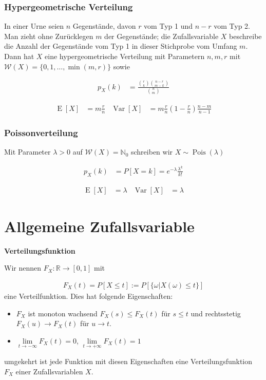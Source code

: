 \documentclass[25pt]{sciposter}
\newcommand{\R}{\mathbb{R}}
\newcommand{\N}{\mathbb{N}}
\newcommand{\W}{\mathcal{W}}
\newcommand{\Var}{\operatorname{Var}}
\newcommand{\E}{\operatorname{E}}
\newenvironment{method}[1]{\begin{mdframed}[backgroundcolor=blue!10,innertopmargin=15pt, innerbottommargin=15pt,nobreak=true]
		\textbf{#1 }
	}
	{ 
	\end{mdframed}
}
\begin{document}
\begin{multicols}{3}
\subsubsection*{Hypergeometrische Verteilung}
In einer Urne seien $n$ Gegenstände, davon $r$ vom Typ 1 und $n-r$ vom Typ 2. Man
zieht ohne Zurücklegen $m$ der Gegenstände; die Zufallsvariable $X$ beschreibe die Anzahl
der Gegenstände vom Typ 1 in dieser Stichprobe vom Umfang $m$. Dann hat $X$ eine
hypergeometrische Verteilung mit Parametern $n,m,r$ mit $\W(X) = \{0, 1, \ldots, \min(m, r)\}$ sowie

\begin{align*}
	p_X(k) &= \frac{{r\choose k} {n-r \choose m-k}}{{n \choose m}}
\end{align*}

\begin{align*}
\E[X] &= m\frac{r}{n} & \Var[X] &= m\frac{r}{n}\left(1-\frac{r}{n}\right) \frac{n-m}{n-1}
\end{align*}



\subsubsection*{Poissonverteilung}

Mit Parameter $\lambda>0$ auf $\W(X) = \N_0$ schreiben wir $X\sim {\operatorname{Pois}}(\lambda)$

\begin{align*}
	p_X(k) &= P[X = k] = e^{-\lambda} \frac{\lambda^k}{k!}
\end{align*}

\begin{align*}
\E[X] &= \lambda & \Var[X] &= \lambda
\end{align*}




\section{Allgemeine Zufallsvariable}



\begin{method}{Verteilungsfunktion}
	Wir nennen $F_X : \R \to [0,1]$ mit 
	
	\begin{align*}
		F_X (t) = P[X\leq t]:= P[\{\omega | X(\omega) \leq t\}]
	\end{align*}
	eine Verteilfunktion. Dies hat folgende Eigenschaften:
	\begin{itemize}
		\item $F_X$ ist monoton wachsend $F_X(s)\leq F_X(t)$ für $s\leq t$ und rechtsstetig $F_X(u) \to F_X(t)$ für $u \to t$.
		\item $\lim\limits_{t\to-\infty} F_X(t) = 0$, $\lim\limits_{t\to + \infty} F_X(t) = 1$ 
	\end{itemize}
	umgekehrt ist jede Funktion mit diesen Eigenschaften eine Verteilungsfunktion $F_X$ einer Zufallsvariablen $X$.
\end{method}



\end{multicols}
\end{document}
